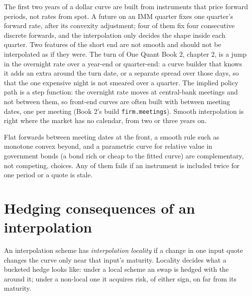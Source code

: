 The first two years of a dollar curve are built from instruments that price
forward periods, not rates from spot. A future on an IMM quarter fixes one
quarter's forward rate, after its convexity adjustment; four of them fix four
consecutive discrete forwards, and the interpolation only decides the shape
inside each quarter. Two features of the short end are not smooth and should
not be interpolated as if they were. The turn
of One Quant Book 2, chapter 2, is a jump in the overnight rate over a
year-end or quarter-end: a curve builder that knows it adds an extra 
around the turn date, or a separate spread over those days, so that the one
expensive night is not smeared over a quarter. The implied policy path
is a step function: the overnight rate moves at central-bank meetings and not
between them, so front-end curves are often built with  between meeting dates, one  per meeting (Book 2's build
\texttt{firm.meetings}). Smooth interpolation is right where the market has no
calendar, from two or three years on.

\begin{remark}\label{rem:rc:curve-construction:which}
Flat forwards between meeting dates at the front, a smooth rule such as
monotone convex beyond, and a parametric curve for relative value in
government bonds (a bond rich or cheap to the fitted curve) are complementary,
not competing, choices. Any of them fails if an instrument is included twice
for one period or a quote is stale.
\end{remark}

\section{Hedging consequences of an interpolation}

\begin{definition}\label{def:rc:curve-construction:locality}
An interpolation scheme has \emph{interpolation locality} if a change in one input quote changes the curve only near that
input's maturity. Locality decides what a bucketed hedge looks like: under a
local scheme an  swap is hedged with the  around it; under a
non-local one it acquires risk, of either sign, on  far from its
maturity.
\end{definition}

